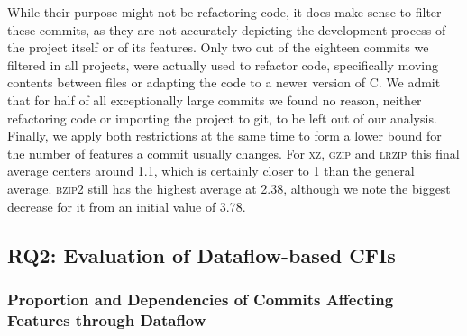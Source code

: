 While their purpose might not be refactoring code, it does make sense to filter these commits, as they are not accurately depicting the development process of the project itself or of its features.
Only two out of the eighteen commits we filtered in all projects, were actually used to refactor code, specifically moving contents between files or adapting the code to a newer version of C.
We admit that for half of all exceptionally large commits we found no reason, neither refactoring code or importing the project to git, to be left out of our analysis.
Finally, we apply both restrictions at the same time to form a lower bound for the number of features a commit usually changes.
For \textsc{xz}, \textsc{gzip} and \textsc{lrzip} this final average centers around 1.1, which is certainly closer to 1 than the general average.
\textsc{bzip2} still has the highest average at 2.38, although we note the biggest decrease for it from an initial value of 3.78. 

\subsection*{\textbf{RQ2: Evaluation of Dataflow-based CFIs}}\label{sec:eval_df_cfis}

\subsubsection*{Proportion and Dependencies of Commits Affecting Features through Dataflow}\label{sec:eval_commit_dfbr}

